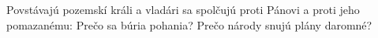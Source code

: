 Povstávajú pozemskí králi
a vladári sa spolčujú
\versseparator
proti Pánovi a proti jeho pomazanému:
\versseparator
Prečo sa búria pohania?
Prečo národy snujú plány daromné?